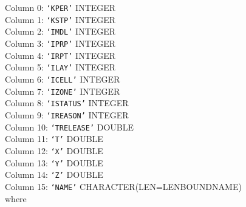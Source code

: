 \vspace{5mm}
\noindent Column 0: \texttt{`KPER'} {\color{red} \footnotesize{INTEGER}} \\
\noindent Column 1: \texttt{`KSTP'} {\color{red} \footnotesize{INTEGER}} \\
\noindent Column 2: \texttt{`IMDL'} {\color{red} \footnotesize{INTEGER}} \\
\noindent Column 3: \texttt{`IPRP'} {\color{red} \footnotesize{INTEGER}} \\
\noindent Column 4: \texttt{`IRPT'} {\color{red} \footnotesize{INTEGER}} \\
\noindent Column 5: \texttt{`ILAY'} {\color{red} \footnotesize{INTEGER}} \\
\noindent Column 6: \texttt{`ICELL'} {\color{red} \footnotesize{INTEGER}} \\
\noindent Column 7: \texttt{`IZONE'} {\color{red} \footnotesize{INTEGER}} \\
\noindent Column 8: \texttt{`ISTATUS'} {\color{red} \footnotesize{INTEGER}} \\
\noindent Column 9: \texttt{`IREASON'} {\color{red} \footnotesize{INTEGER}} \\
\noindent Column 10: \texttt{`TRELEASE'} {\color{red} \footnotesize{DOUBLE}} \\
\noindent Column 11: \texttt{`T'} {\color{red} \footnotesize{DOUBLE}} \\
\noindent Column 12: \texttt{`X'} {\color{red} \footnotesize{DOUBLE}} \\
\noindent Column 13: \texttt{`Y'} {\color{red} \footnotesize{DOUBLE}} \\
\noindent Column 14: \texttt{`Z'} {\color{red} \footnotesize{DOUBLE}} \\
\noindent Column 15: \texttt{`NAME'} {\color{red} \footnotesize{CHARACTER(LEN=LENBOUNDNAME)}} \\

\vspace{2mm}
\noindent where

